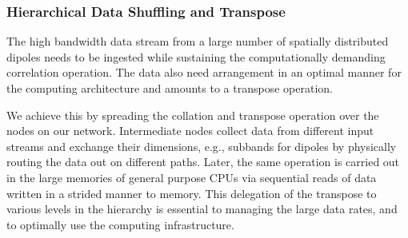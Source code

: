 \documentclass{ws-jai}
\begin{document}
\subsubsection   {Hierarchical  Data   Shuffling  and  Transpose}
  The  high
bandwidth data stream from a large number of spatially distributed dipoles needs
to  be  ingested  while  sustaining the  computationally  demanding  correlation
operation. The data also need arrangement in an optimal manner for the computing
architecture and amounts to a transpose operation.

We achieve  this by  spreading the  collation and  transpose operation  over the
nodes  on our  network. Intermediate  nodes  collect data  from different  input
streams and exchange their dimensions,  e.g., subbands for dipoles by physically
routing the  data out on different  paths. Later, the same  operation is carried
out in the large  memories of general purpose CPUs via  sequential reads of data
written  in a  strided manner  to memory.  This delegation  of the  transpose to
various levels in  the hierarchy is essential to managing  the large data rates,
and to optimally use the computing infrastructure.

\end{document}
